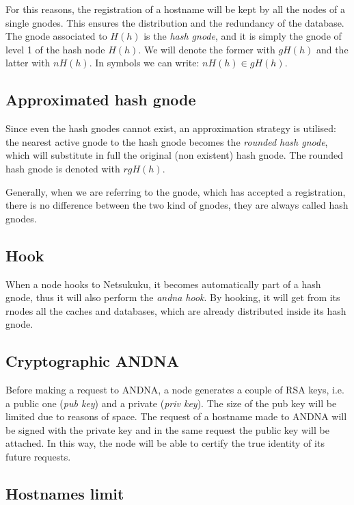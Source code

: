 \documentclass[a4paper]{article}
\begin{document}
For this reasons, the registration of a hostname will be kept by all the nodes
of a single gnodes. This ensures the distribution and the redundancy of the
database. The gnode associated to $H(h)$ is the \emph{hash gnode}, and it is
simply the gnode of level 1 of the hash node $H(h)$. We will denote the former
with $gH(h)$ and the latter with $nH(h)$. In symbols we can write: $nH(h) \in
gH(h)$.

\subsection{Approximated hash gnode}
Since even the hash gnodes cannot exist, an approximation strategy is
utilised: the nearest active gnode to the hash gnode becomes the
\emph{rounded hash gnode}, which will substitute in full the original (non
existent) hash gnode. The rounded hash gnode is denoted with $rgH(h)$.

Generally, when we are referring to the gnode, which has accepted a
registration, there is no difference between the two kind of gnodes, they are
always called hash gnodes.

\subsection{Hook}

When a node hooks to Netsukuku, it becomes automatically part of a hash gnode,
thus it will also perform the \emph{andna hook}.
By hooking, it will get from its rnodes all the caches and databases, which
are already distributed inside its hash gnode.

\subsection{Cryptographic ANDNA}
  
Before making a request to ANDNA, a node generates a couple of RSA keys,
i.e. a public one (\emph{pub key}) and a private (\emph{priv key}). The size of the
pub key will be limited due to reasons of space.
The request of a hostname made to ANDNA will be signed with the private key
and in the same request the public key will be attached.
In this way, the node will be able to certify the true identity of its
future requests.

\subsection{Hostnames limit}
\end{document}
